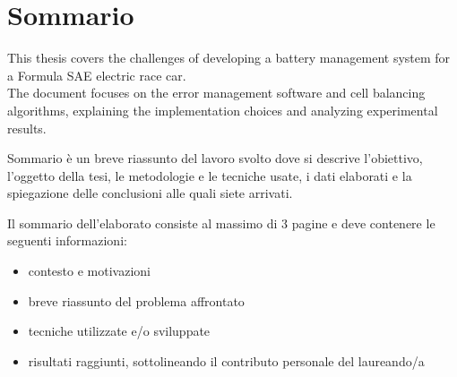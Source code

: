 \chapter*{Sommario} %
\label{sommario}

This thesis covers the challenges of developing a battery management system for a Formula SAE electric race car.\\ The document focuses on the error management software and cell balancing algorithms, explaining the implementation choices and analyzing experimental results.

Sommario è un breve riassunto del lavoro svolto dove si descrive l'obiettivo, l'oggetto della tesi, le
metodologie e le tecniche usate, i dati elaborati e la spiegazione delle conclusioni alle quali siete arrivati.

Il sommario dell’elaborato consiste al massimo di 3 pagine e deve contenere le seguenti informazioni:
\begin{itemize}
  \item contesto e motivazioni
  \item breve riassunto del problema affrontato
  \item tecniche utilizzate e/o sviluppate
  \item risultati raggiunti, sottolineando il contributo personale del laureando/a
\end{itemize}




